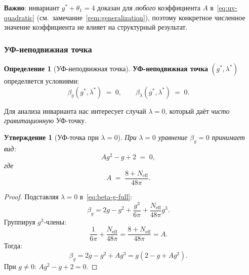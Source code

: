 \documentclass[11pt,a4paper]{article}
\newtheorem{proposition}[theorem]{Утверждение}
\theoremstyle{definition}
\newtheorem{definition}[theorem]{Определение}
\begin{document}
\medskip\noindent
\textbf{Важно}: инвариант $g^* + \theta_1 = 4$ доказан для
\emph{любого} коэффициента $A$ в~\eqref{eq:uv-quadratic}
(см.~замечание~\ref{rem:generalization}), поэтому
конкретное численное значение коэффициента не влияет
на структурный результат.

\subsubsection{УФ-неподвижная точка}

\begin{definition}[УФ-неподвижная точка]
\label{def:uv-fixed-point}
\textbf{УФ-неподвижная точка} $(g^*, \lambda^*)$ определяется
условиями:
\begin{equation}
    \beta_g(g^*, \lambda^*) \;=\; 0, \qquad
    \beta_\lambda(g^*, \lambda^*) \;=\; 0.
    \label{eq:fixed-point-conditions}
\end{equation}
\end{definition}

\medskip\noindent
Для анализа инварианта нас интересует случай $\lambda = 0$,
который даёт \emph{чисто гравитационную} УФ-точку.

\begin{proposition}[УФ-точка при $\lambda = 0$]
\label{prop:uv-lambda-zero}
При $\lambda = 0$ уравнение $\beta_g = 0$ принимает вид:
\begin{equation}
    A g^2 - g + 2 \;=\; 0,
    \label{eq:uv-quadratic}
\end{equation}
где
\begin{equation}
    \boxed{
    A \;=\; \frac{8 + N_{\text{eff}}}{48\pi}.
    }
    \label{eq:A-coefficient}
\end{equation}
\end{proposition}

\begin{proof}
Подставляя $\lambda = 0$ в~\eqref{eq:beta-g-full}:
\begin{equation}
    \beta_g = 2g - g^2 + \frac{g^3}{6\pi}
    + \frac{N_{\text{eff}}}{48\pi} g^3.
\end{equation}
Группируя $g^3$-члены:
\begin{equation}
    \frac{1}{6\pi} + \frac{N_{\text{eff}}}{48\pi}
    = \frac{8 + N_{\text{eff}}}{48\pi} = A.
\end{equation}
Тогда:
\begin{equation}
    \beta_g = 2g - g^2 + A g^3 = g(2 - g + A g^2).
\end{equation}
При $g \neq 0$: $A g^2 - g + 2 = 0$.
\end{proof}
\end{document}
